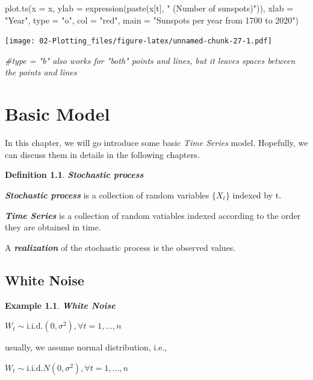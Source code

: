 \documentclass[
]{book}
\newenvironment{Shaded}{\begin{snugshade}}{\end{snugshade}}
\newcommand{\AttributeTok}[1]{\textcolor[rgb]{0.77,0.63,0.00}{#1}}
\newcommand{\CommentTok}[1]{\textcolor[rgb]{0.56,0.35,0.01}{\textit{#1}}}
\newcommand{\FunctionTok}[1]{\textcolor[rgb]{0.00,0.00,0.00}{#1}}
\newcommand{\NormalTok}[1]{#1}
\newcommand{\StringTok}[1]{\textcolor[rgb]{0.31,0.60,0.02}{#1}}
\theoremstyle{definition}
\newtheorem{definition}{Definition}[chapter]
\theoremstyle{definition}
\newtheorem{example}{Example}[chapter]
\theoremstyle{definition}
\theoremstyle{definition}
\theoremstyle{remark}
\begin{document}
\begin{Shaded}
\begin{Highlighting}[]
\FunctionTok{plot.ts}\NormalTok{(}\AttributeTok{x =}\NormalTok{ x, }\AttributeTok{ylab =} \FunctionTok{expression}\NormalTok{(}\FunctionTok{paste}\NormalTok{(x[t], }\StringTok{" (Number of sunspots)"}\NormalTok{)),}
  \AttributeTok{xlab =} \StringTok{"Year"}\NormalTok{, }\AttributeTok{type =} \StringTok{"o"}\NormalTok{, }\AttributeTok{col =} \StringTok{"red"}\NormalTok{, }\AttributeTok{main =} \StringTok{"Sunspots per year from 1700 to 2020"}\NormalTok{)}
\end{Highlighting}
\end{Shaded}

\texttt{[image: 02-Plotting\_files/figure-latex/unnamed-chunk-27-1.pdf]}

\begin{Shaded}
\begin{Highlighting}[]
\CommentTok{\#type = "b" also works for "both" points and lines, but it leaves spaces between the points and lines}
\end{Highlighting}
\end{Shaded}

\hypertarget{basic-model}{%
\chapter{Basic Model}\label{basic-model}}

In this chapter, we will go introduce some basic \emph{Time Series} model. Hopefully, we can discuss them in details in the following chapters.

\begin{definition}
\textbf{\emph{Stochastic process}}

\textbf{\emph{Stochastic process}} is a collection of random variables \(\{X_t\}\) indexed by t.

\textbf{\emph{Time Series}} is a collection of random vatiables indexed according to the order they are obtained in time.

A \textbf{\emph{realization}} of the stochastic process is the observed values.
\end{definition}

\hypertarget{white-noise}{%
\section{White Noise}\label{white-noise}}

\begin{example}
\textbf{\emph{White Noise}}

\(W_t\sim \mathrm{i.i.d.} (0,\sigma^2) , \forall t=1,...,n\)

usually, we assume normal distribution, i.e.,

\(W_t\sim \mathrm{i.i.d.} N(0,\sigma^2) , \forall t=1,...,n\)
\end{example}
\end{document}
